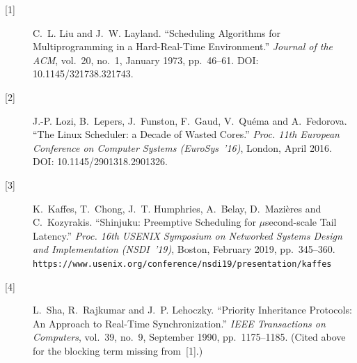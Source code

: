 \begin{description}
\item[{[1]}] C.~L. Liu and J.~W. Layland. ``Scheduling Algorithms for Multiprogramming
  in a Hard-Real-Time Environment.'' \emph{Journal of the ACM}, vol.~20, no.~1,
  January 1973, pp.~46--61. DOI: 10.1145/321738.321743.
\item[{[2]}] J.-P. Lozi, B.~Lepers, J.~Funston, F.~Gaud, V.~Qu\'ema and A.~Fedorova.
  ``The Linux Scheduler: a Decade of Wasted Cores.'' \emph{Proc. 11th European
  Conference on Computer Systems (EuroSys~'16)}, London, April 2016.
  DOI: 10.1145/2901318.2901326.
\item[{[3]}] K.~Kaffes, T.~Chong, J.~T. Humphries, A.~Belay, D.~Mazi\`eres and
  C.~Kozyrakis. ``Shinjuku: Preemptive Scheduling for $\mu$second-scale Tail Latency.''
  \emph{Proc. 16th USENIX Symposium on Networked Systems Design and Implementation
  (NSDI~'19)}, Boston, February 2019, pp.~345--360.
  \texttt{https://www.usenix.org/conference/nsdi19/presentation/kaffes}
\item[{[4]}] L.~Sha, R.~Rajkumar and J.~P. Lehoczky. ``Priority Inheritance Protocols:
  An Approach to Real-Time Synchronization.'' \emph{IEEE Transactions on Computers},
  vol.~39, no.~9, September 1990, pp.~1175--1185. (Cited above for the blocking term
  missing from~[1].)
\end{description}
